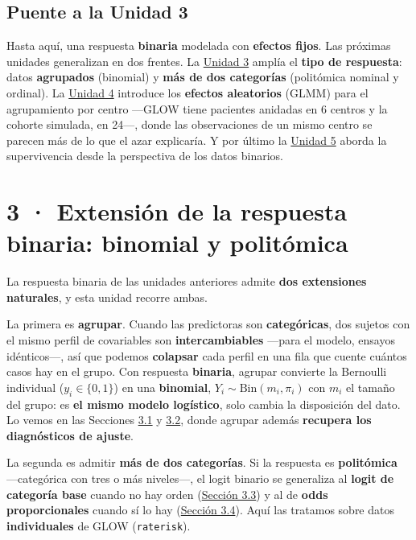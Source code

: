 \documentclass[
  letterpaper,
  DIV=11,
  numbers=noendperiod]{scrartcl}
\begin{document}
\hypertarget{sec-u12-puente}{%
\subsection{Puente a la Unidad 3}\label{sec-u12-puente}}

Hasta aquí, una respuesta \textbf{binaria} modelada con \textbf{efectos
fijos}. Las próximas unidades generalizan en dos frentes. La
\protect\hyperlink{sec-u13}{Unidad 3} amplía el \textbf{tipo de
respuesta}: datos \textbf{agrupados} (binomial) y \textbf{más de dos
categorías} (politómica nominal y ordinal). La
\protect\hyperlink{sec-u14}{Unidad 4} introduce los \textbf{efectos
aleatorios} (GLMM) para el agrupamiento por centro ---GLOW tiene
pacientes anidadas en 6 centros y la cohorte simulada, en 24---, donde
las observaciones de un mismo centro se parecen más de lo que el azar
explicaría. Y por último la \protect\hyperlink{sec-u15}{Unidad 5} aborda
la supervivencia desde la perspectiva de los datos binarios.

\hypertarget{sec-u13}{%
\section{3 · Extensión de la respuesta binaria: binomial y
politómica}\label{sec-u13}}

La respuesta binaria de las unidades anteriores admite \textbf{dos
extensiones naturales}, y esta unidad recorre ambas.

La primera es \textbf{agrupar}. Cuando las predictoras son
\textbf{categóricas}, dos sujetos con el mismo perfil de covariables son
\textbf{intercambiables} ---para el modelo, ensayos idénticos---, así
que podemos \textbf{colapsar} cada perfil en una fila que cuente cuántos
casos hay en el grupo. Con respuesta \textbf{binaria}, agrupar convierte
la Bernoulli individual (\(y_i\in\{0,1\}\)) en una \textbf{binomial},
\(Y_i\sim\mathrm{Bin}(m_i,\pi_i)\) con \(m_i\) el tamaño del grupo: es
\textbf{el mismo modelo logístico}, solo cambia la disposición del dato.
Lo vemos en las Secciones \protect\hyperlink{sec-u13-binomial}{3.1} y
\protect\hyperlink{sec-u13-gof-binomial}{3.2}, donde agrupar además
\textbf{recupera los diagnósticos de ajuste}.

La segunda es admitir \textbf{más de dos categorías}. Si la respuesta es
\textbf{politómica} ---categórica con tres o más niveles---, el logit
binario se generaliza al \textbf{logit de categoría base} cuando no hay
orden (\protect\hyperlink{sec-u13-nominal}{Sección 3.3}) y al de
\textbf{odds proporcionales} cuando sí lo hay
(\protect\hyperlink{sec-u13-ordinal}{Sección 3.4}). Aquí las tratamos
sobre datos \textbf{individuales} de GLOW (\texttt{raterisk}).
\end{document}
